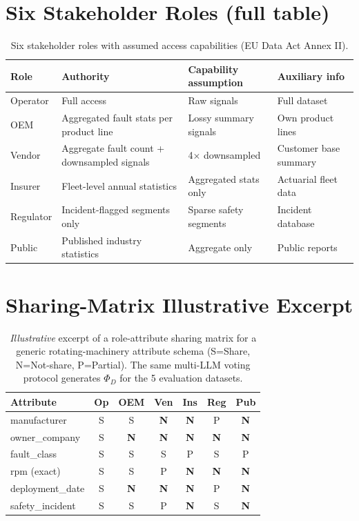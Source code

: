 \documentclass{article}
\theoremstyle{remark}
\begin{document}
\section{Six Stakeholder Roles (full table)}
\label{app:roles}
\begin{table}[h]
\centering
\caption{Six stakeholder roles with assumed access capabilities (EU Data Act Annex II).}
\label{tab:roles}
\small
\begin{tabularx}{\textwidth}{@{}lXXX@{}}
\toprule
Role & Authority & Capability assumption & Auxiliary info \\
\midrule
Operator & Full access & Raw signals & Full dataset \\
OEM & Aggregated fault stats per product line & Lossy summary signals & Own product lines \\
Vendor & Aggregate fault count + downsampled signals & 4$\times$ downsampled & Customer base summary \\
Insurer & Fleet-level annual statistics & Aggregated stats only & Actuarial fleet data \\
Regulator & Incident-flagged segments only & Sparse safety segments & Incident database \\
Public & Published industry statistics & Aggregate only & Public reports \\
\bottomrule
\end{tabularx}
\end{table}

\section{Sharing-Matrix Illustrative Excerpt}
\label{app:phi_paderborn}
\begin{table}[h]
\centering
\caption{\emph{Illustrative} excerpt of a role-attribute sharing matrix for a generic rotating-machinery attribute schema (S=Share, N=Not-share, P=Partial). The same multi-LLM voting protocol generates $\Phi_D$ for the 5 evaluation datasets.}
\label{tab:phi_paderborn}
\small
\begin{tabular}{@{}lcccccc@{}}
\toprule
Attribute & Op & OEM & Ven & Ins & Reg & Pub \\
\midrule
manufacturer & S & S & \textbf{N} & \textbf{N} & P & \textbf{N} \\
owner\_company & S & \textbf{N} & \textbf{N} & \textbf{N} & \textbf{N} & \textbf{N} \\
fault\_class & S & S & S & P & S & P \\
rpm (exact) & S & S & P & \textbf{N} & \textbf{N} & \textbf{N} \\
deployment\_date & S & \textbf{N} & \textbf{N} & \textbf{N} & P & \textbf{N} \\
safety\_incident & S & S & P & \textbf{N} & S & \textbf{N} \\
\bottomrule
\end{tabular}
\end{table}
\end{document}
